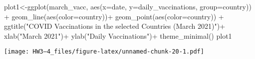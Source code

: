 \documentclass[
]{article}
\newenvironment{Shaded}{\begin{snugshade}}{\end{snugshade}}
\newcommand{\AttributeTok}[1]{\textcolor[rgb]{0.77,0.63,0.00}{#1}}
\newcommand{\FunctionTok}[1]{\textcolor[rgb]{0.00,0.00,0.00}{#1}}
\newcommand{\NormalTok}[1]{#1}
\newcommand{\OtherTok}[1]{\textcolor[rgb]{0.56,0.35,0.01}{#1}}
\newcommand{\SpecialCharTok}[1]{\textcolor[rgb]{0.00,0.00,0.00}{#1}}
\newcommand{\StringTok}[1]{\textcolor[rgb]{0.31,0.60,0.02}{#1}}
\begin{document}
\begin{Shaded}
\begin{Highlighting}[]
\NormalTok{plot1}\OtherTok{\textless{}{-}}\FunctionTok{ggplot}\NormalTok{(march\_vacc, }\FunctionTok{aes}\NormalTok{(}\AttributeTok{x=}\NormalTok{date, }\AttributeTok{y=}\NormalTok{daily\_vaccinations, }\AttributeTok{group=}\NormalTok{country)) }\SpecialCharTok{+}
  \FunctionTok{geom\_line}\NormalTok{(}\FunctionTok{aes}\NormalTok{(}\AttributeTok{color=}\NormalTok{country))}\SpecialCharTok{+}
  \FunctionTok{geom\_point}\NormalTok{(}\FunctionTok{aes}\NormalTok{(}\AttributeTok{color=}\NormalTok{country)) }\SpecialCharTok{+}
  \FunctionTok{ggtitle}\NormalTok{(}\StringTok{"COVID Vaccinations in the selected Countries (March 2021)"}\NormalTok{)}\SpecialCharTok{+}
  \FunctionTok{xlab}\NormalTok{(}\StringTok{"March 2021"}\NormalTok{)}\SpecialCharTok{+}
  \FunctionTok{ylab}\NormalTok{(}\StringTok{"Daily Vaccinations"}\NormalTok{)}\SpecialCharTok{+}
  \FunctionTok{theme\_minimal}\NormalTok{()}
\NormalTok{plot1}
\end{Highlighting}
\end{Shaded}

\texttt{[image: HW3---4\_files/figure-latex/unnamed-chunk-20-1.pdf]}
\end{document}
